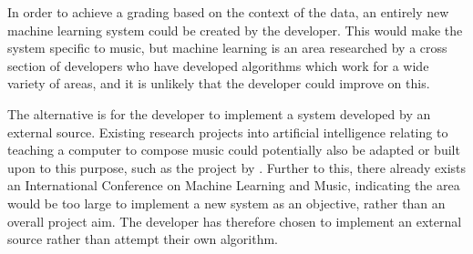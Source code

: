 In order to achieve a grading based on the context of the data, an entirely new machine learning system could be created by the developer. This would make the system specific to music, but machine learning is an area researched by a cross section of developers who have developed algorithms which work for a wide variety of areas, and it is unlikely that the developer could improve on this.

The alternative is for the developer to implement a system developed by an external source.
Existing research projects into artificial intelligence relating to teaching a computer to compose music could potentially also be adapted or built upon to this purpose, such as the project by \cite{creativeMachines}. Further to this, there already exists an International Conference on Machine Learning and Music, indicating the area would be too large to implement a new system as an objective, rather than an overall project aim.
The developer has therefore chosen to implement an external source rather than attempt their own algorithm.



